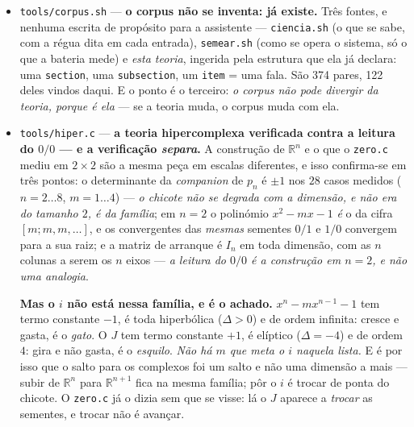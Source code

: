 \documentclass[11pt]{article}
\newcommand{\code}[1]{\texttt{\small #1}}
\newcommand{\R}{\mathbb R}
\theoremstyle{plain}
\theoremstyle{remark}
\begin{document}
\begin{itemize}
E sobe de dimensão sem uma linha nova ($n=3,4,5$ medidos). Em $\sigma^5=\sigma^4+1$ --- o
polinómio do furo --- a máquina opera na mesma: \emph{operar não exige que o quociente seja
corpo}; o que falha lá é a \emph{inversa}, não o produto, e é essa a diferença entre anel e corpo.
A régua $(B,C,\Delta)$ lê-se da própria borda ($\sigma^2=b_0+b_1\sigma$ dá $B=b_1$, $C=-b_0$):
\emph{declarar o corpo é declarar a régua}. E a notação é reversível --- $343$ tuplas de $\R^3$
escritas e relidas, resíduo $0$: a marcação posicional e a simbólica guardam a mesma informação.
A assistente opera lá com \code{borda | expressão}.

\item \code{tools/corpus.sh} --- \textbf{o corpus não se inventa: já existe.} Três fontes, e
nenhuma escrita de propósito para a assistente --- \code{ciencia.sh} (o que se sabe, com a régua
dita em cada entrada), \code{semear.sh} (como se opera o sistema, só o que a bateria mede) e
\emph{esta teoria}, ingerida pela estrutura que ela já declara: uma \code{section}, uma
\code{subsection}, um \code{item} = uma fala. São 374 pares, 122 deles vindos daqui. E o ponto é
o terceiro: \emph{o corpus não pode divergir da teoria, porque é ela} --- se a teoria muda, o
corpus muda com ela.

\item \code{tools/hiper.c} --- \textbf{a teoria hipercomplexa verificada contra a leitura do
$0/0$ --- e a verificação \emph{separa}.} A construção de $\R^n$ e o que o \code{zero.c} mediu em
$2\times 2$ são a mesma peça em escalas diferentes, e isso confirma-se em três pontos: o
determinante da \emph{companion} de $p_n$ é $\pm 1$ nos $28$ casos medidos ($n = 2\ldots8$,
$m = 1\ldots4$) --- \emph{o chicote não se degrada com a dimensão, e não era do tamanho $2$, é da
família}; em $n=2$ o polinómio $x^2 - mx - 1$ \emph{é} o da cifra $[m;m,m,\ldots]$, e os
convergentes das \emph{mesmas} sementes $0/1$ e $1/0$ convergem para a sua raiz; e a matriz de
arranque é $I_n$ em toda dimensão, com as $n$ colunas a serem os $n$ eixos --- \emph{a leitura do
$0/0$ é a construção em $n=2$, e não uma analogia}.

\textbf{Mas o $i$ não está nessa família, e é o achado.} $x^n - mx^{n-1} - 1$ tem termo constante
$-1$, é toda hiperbólica ($\Delta > 0$) e de ordem infinita: cresce e gasta, é o \emph{gato}. O
$J$ tem termo constante $+1$, é elíptico ($\Delta = -4$) e de ordem $4$: gira e não gasta, é o
\emph{esquilo}. \emph{Não há $m$ que meta o $i$ naquela lista.} E é por isso que o salto para os
complexos foi um salto e não uma dimensão a mais --- subir de $\R^n$ para $\R^{n+1}$ fica na mesma
família; pôr o $i$ é trocar de ponta do chicote. O \code{zero.c} já o dizia sem que se visse: lá o
$J$ aparece a \emph{trocar} as sementes, e trocar não é avançar.


\end{itemize}
\end{document}
